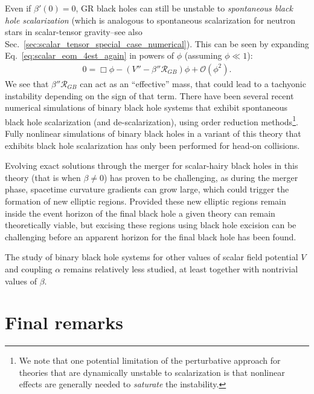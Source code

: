 \documentclass{ws-ijmpd}
\begin{document}
Even if $\beta'\left(0\right)=0$, GR black holes can still
be unstable to 
\emph{spontaneous black hole scalarization}\cite{Doneva:2017bvd,
Silva:2017uqg,
Minamitsuji:2018xde,Silva:2018qhn,
Dima:2020yac,Herdeiro:2020wei,Berti:2020kgk}
(which is analogous to spontaneous scalarization for
neutron stars in scalar-tensor gravity\cite{Damour:1996ke}--see also 
Sec.~\ref{sec:scalar_tensor_special_case_numerical}).
This can be seen by expanding Eq.~\eqref{eq:scalar_eom_4est_again}
in powers of $\phi$ (assuming $\phi\ll1$):
\begin{align}
   0
   =
   \Box\phi 
   -
   \left(V'' - \beta''\mathcal{R}_{GB}\right)\phi
   +
   \mathcal{O}\left(\phi^2\right)
   .
\end{align}
We see that $\beta''\mathcal{R}_{GB}$ can act as an ``effective''
mass, that could lead to a tachyonic instability depending on
the sign of that term.
There have been several recent numerical simulations of binary
black hole systems that exhibit spontaneous black hole scalarization
(and de-scalarization), using order reduction 
methods\cite{Silva:2020omi,Elley:2022ept}\footnote{We note that
one potential limitation of the perturbative approach for theories
that are dynamically unstable to scalarization is that nonlinear
effects are generally needed to \emph{saturate} the instability.}.
Fully nonlinear simulations of binary black holes
in a variant of this theory that exhibits black hole scalarization
has only been performed for head-on collisions\cite{East:2021bqk}.

Evolving exact solutions
through the merger for scalar-hairy black holes in this
theory (that is when $\beta\neq0$) has proven to be challenging, 
as during the merger phase, spacetime curvature gradients can grow
large, which could trigger the formation of new elliptic regions.
Provided these new elliptic regions remain inside the event horizon
of the final black hole a given theory can remain theoretically viable,
but excising these regions using black hole excision can be challenging
before an apparent horizon for the final black hole has been found.

The study of binary black hole systems for other values of scalar
field potential $V$ and coupling $\alpha$ remains relatively
less studied, at least together with nontrivial values of $\beta$. 

\section{Final remarks\label{sec:final_remarks}}
\end{document}
